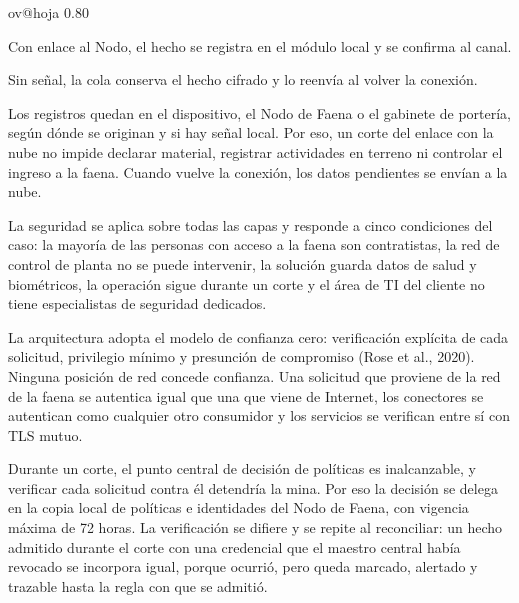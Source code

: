 \documentclass[subdoc]{../../comun/overfore}
\begin{document}
\begin{horizontal}
\csname ov@hoja\endcsname{330.2mm}{215.9mm}
\expandafter\def\csname ov@altofig\endcsname{0.80}

\clearpage
\addtocounter{figure}{-1}
\begingroup
\def\thefigure{4.22a}
\def\theHfigure{4.22a}
\endgroup
Con enlace al Nodo, el hecho se registra en el módulo local y se confirma al canal.

\clearpage
\addtocounter{figure}{-1}
\begingroup
\def\thefigure{4.22b}
\def\theHfigure{4.22b}
\endgroup
Sin señal, la cola conserva el hecho cifrado y lo reenvía al volver la conexión.
\end{horizontal}
Los registros quedan en el dispositivo, el Nodo de Faena o el gabinete de portería, según dónde se originan y si hay señal local. Por eso, un corte del enlace con la nube no impide declarar material, registrar actividades en terreno ni controlar el ingreso a la faena. Cuando vuelve la conexión, los datos pendientes se envían a la nube.

La seguridad se aplica sobre todas las capas y responde a cinco condiciones del caso: la mayoría de las personas con acceso a la faena son contratistas, la red de control de planta no se puede intervenir, la solución guarda datos de salud y biométricos, la operación sigue durante un corte y el área de TI del cliente no tiene especialistas de seguridad dedicados.

La arquitectura adopta el modelo de confianza cero: verificación explícita de cada solicitud, privilegio mínimo y presunción de compromiso (Rose et al., 2020). Ninguna posición de red concede confianza. Una solicitud que proviene de la red de la faena se autentica igual que una que viene de Internet, los conectores se autentican como cualquier otro consumidor y los servicios se verifican entre sí con TLS mutuo.

Durante un corte, el punto central de decisión de políticas es inalcanzable, y verificar cada solicitud contra él detendría la mina. Por eso la decisión se delega en la copia local de políticas e identidades del Nodo de Faena, con vigencia máxima de 72 horas. La verificación se difiere y se repite al reconciliar: un hecho admitido durante el corte con una credencial que el maestro central había revocado se incorpora igual, porque ocurrió, pero queda marcado, alertado y trazable hasta la regla con que se admitió.
\end{document}
